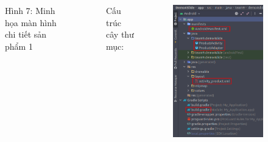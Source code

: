 \documentclass{beamer}
\begin{document}
\begin{frame}
\begin{columns}
\begin{figure}
            \caption{\centering\tiny{Hình 7: Minh họa màn hình chi tiết sản phẩm 1}}
        \end{figure}
        \indent Cấu trúc cây thư mục:
        \begin{figure}
            \centering
            \includegraphics[height=0.68\textheight]{images/31.png}
        \end{figure}
    \end{columns}
\end{frame}
\end{document}
